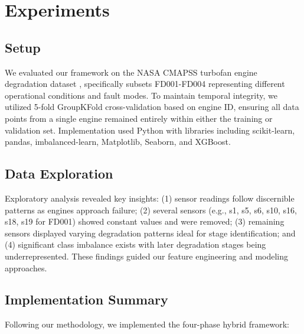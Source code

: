 \section{Experiments}
\label{sec:experiments}
\subsection{Setup}
We evaluated our framework on the NASA CMAPSS turbofan engine degradation dataset \cite{cmapss_data}, specifically subsets FD001-FD004 representing different operational conditions and fault modes. To maintain temporal integrity, we utilized 5-fold GroupKFold cross-validation based on engine ID, ensuring all data points from a single engine remained entirely within either the training or validation set. Implementation used Python with libraries including scikit-learn, pandas, imbalanced-learn, Matplotlib, Seaborn, and XGBoost.

\subsection{Data Exploration}
Exploratory analysis revealed key insights: (1) sensor readings follow discernible patterns as engines approach failure; (2) several sensors (e.g., s1, s5, s6, s10, s16, s18, s19 for FD001) showed constant values and were removed; (3) remaining sensors displayed varying degradation patterns ideal for stage identification; and (4) significant class imbalance exists with later degradation stages being underrepresented. These findings guided our feature engineering and modeling approaches.

\subsection{Implementation Summary}
Following our methodology, we implemented the four-phase hybrid framework:

